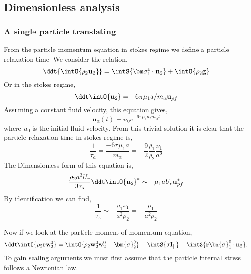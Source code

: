 \subsection{Dimensionless analysis}

\subsubsection*{A single particle translating}
From the particle momentum equation in stokes regime we define a particle relaxation time. 
We consider the relation, 
\begin{equation*}
    \ddt {\intO{\rho_2 \textbf{u}_2}}
    = \intS{\bm\sigma_1^0\cdot \textbf{n}_2}
    + \intO{\rho_2\textbf{g}}
\end{equation*}
Or in the stokes regime, 
\begin{equation*}
    \ddt\intO{\textbf{u}_2}
    = 
    - 6 \pi \mu_1 a /m_\alpha \textbf{u}_{pf}
\end{equation*}
Assuming a constant fluid velocity, this equation gives, 
\begin{equation*}
    \textbf{u}_\alpha(t)
    = u_0 e^{- 6 \pi \mu_1 a /m_\alpha t}
\end{equation*}
where $u_0$ is the initial fluid velocity. 
From this trivial solution it is clear that the particle relaxation time in stokes regime is, 
\begin{equation*}
    \frac{1}{\tau_a}
    = \frac{- 6 \pi \mu_1 a }{m_\alpha}
    = - \frac{9}{2} \frac{\rho_1}{\rho_2} \frac{ \nu_1 }{a^2}
\end{equation*}
The Dimensionless form of this equation is, 
\begin{equation*}
    \frac{\rho_2  a^3 U_r}{3\tau_a}\ddt\intO{\textbf{u}_2}^*
    \sim
    - \mu_1 a U_r \textbf{u}_{pf}^*
\end{equation*}
By identification we can find,  
\begin{equation*}
    \frac{1}{\tau_a}
    \sim
    - \frac{\rho_1 \nu_1}{a^2 \rho_2}
    = 
    - \frac{\mu_1}{a^2 \rho_2}
\end{equation*}

Now if we look at the particle moment of momentum equation, 
\begin{equation}
    \ddt \intO{\rho_2 \textbf{r} \textbf{w}^0_2}
    = \intO{\rho_2  \textbf{w}_2^0 \textbf{w}_2^0 - \bm{\sigma}_2^0}
    - \intS{\sigma \textbf{I}_{||}}
    + \intS{ \textbf{r}\bm{\sigma}_1^0\cdot \textbf{n}_2}. 
\end{equation}
To gain scaling arguments we must first assume that the particle internal stress follows a Newtonian law. 

